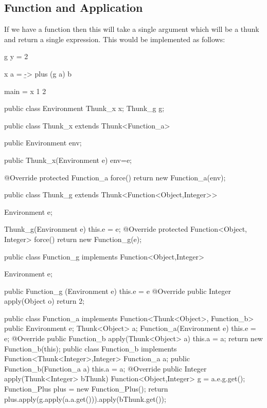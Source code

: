 \documentclass[12pt,a4paper,twoside]{article}
\begin{document}
\subsection{Function and Application}

If we have a function then this will take a single argument which will be a thunk and return a single expression. 
This would be implemented as follows:


\begin{HaskellLst}
g y = 2
  
x a = \b -> plus (g a) b

main = x 1 2
\end{HaskellLst}

\begin{JavaLst}
public class Environment {
    Thunk_x x;
    Thunk_g g;
}

public class Thunk_x extends Thunk<Function_a>{
    public Environment env;

    public Thunk_x(Environment e) {env=e;}

    @Override
    protected Function_a force() {
        return new Function_a(env);
    }
}

public class Thunk_g extends Thunk<Function<Object,Integer>> {
    Environment e;

    Thunk_g(Environment e) {
        this.e = e;
    }
    @Override
    protected Function<Object, Integer> force() {
        return new Function_g(e);
    }
}

public class Function_g implements Function<Object,Integer> {
    Environment e;

    public Function_g (Environment e) {
      this.e = e
    }
    @Override
    public Integer apply(Object o) {
        return 2;
    }
}

public class Function_a implements Function<Thunk<Object>, Function_b> {
    public Environment e;
    Thunk<Object>  a;
    Function_a(Environment e) {
        this.e = e;
    }
    @Override
    public Function_b apply(Thunk<Object> a) {
        this.a = a;
        return new Function_b(this);
    }
}
public class Function_b implements Function<Thunk<Integer>,Integer>{
    Function_a a;
    public Function_b(Function_a a) {
        this.a = a;
    }
    @Override
    public Integer apply(Thunk<Integer> bThunk) {
        Function<Object,Integer> g = a.e.g.get();
        Function_Plus plus = new Function_Plus();
        return plus.apply(g.apply(a.a.get())).apply(bThunk.get());
    }
}
\end{JavaLst}
\end{document}
